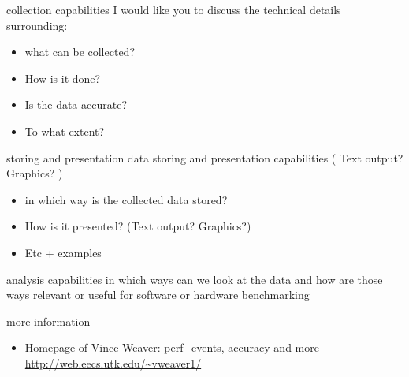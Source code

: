 \begin{frame}{collection capabilities}
I would like you to discuss the technical details surrounding:
\begin{itemize}
  \item what can be collected?
  \item How is it done?
  \item Is the data accurate?
  \item To what extent?
\end{itemize}
\end{frame}



\begin{frame}{storing and presentation}
data storing and presentation capabilities (  Text output? Graphics? )
\begin{itemize}
  \item in which way is the collected data stored?
  \item How is it presented? (Text output? Graphics?)
  \item Etc + examples
\end{itemize}
\end{frame}

\begin{frame}{analysis capabilities}
in which ways can we look at the data and how are those ways relevant or useful for software or hardware benchmarking
\end{frame}

\begin{frame}{more information}
\begin{itemize}
  \item Homepage of Vince Weaver: perf\_events, accuracy and more
    \url{http://web.eecs.utk.edu/~vweaver1/}
\end{itemize}
\end{frame}





